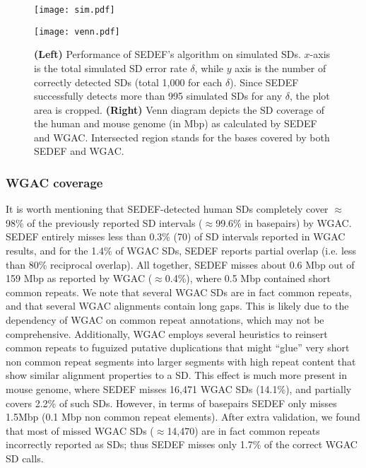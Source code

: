 \documentclass{article}
\begin{document}
\begin{figure*}
\centering
\begin{minipage}[t]{0.45\linewidth}
\texttt{[image: sim.pdf]}
\end{minipage}
\begin{minipage}[t]{0.49\linewidth}
\hspace{1em}\texttt{[image: venn.pdf]}
\end{minipage}
\caption{\textbf{(Left)} Performance of SEDEF's algorithm on simulated SDs. $x$-axis is the total simulated SD error rate $\delta$, while $y$ axis is the number of correctly detected SDs (total 1,000 for each $\delta$). Since SEDEF successfully detects more than 995 simulated SDs for any $\delta$, the plot area is cropped.
\textbf{(Right)} Venn diagram depicts the SD coverage of the human and mouse genome (in Mbp) as calculated by SEDEF and WGAC. Intersected region stands for the bases covered by both SEDEF and WGAC.
} 
\label{fig:err}
\end{figure*}


\subsubsection{WGAC coverage}
It is worth mentioning that SEDEF-detected human SDs completely cover $\approx$98\% of the previously reported SD intervals ($\approx$99.6\% in basepairs) by WGAC. SEDEF entirely misses less than 0.3\% (70) of SD intervals reported in WGAC results, and for the 1.4\% of WGAC SDs, SEDEF reports partial overlap (i.e. less than 80\% reciprocal overlap). All together, SEDEF misses about 0.6 Mbp out of 159 Mbp as reported by WGAC ($\approx$0.4\%), where 0.5 Mbp contained short common repeats.
We note that several WGAC SDs are in fact common repeats, and that several WGAC alignments contain long gaps. This is likely due to the dependency of WGAC on common repeat annotations, which may not be comprehensive. Additionally, WGAC employs several heuristics to reinsert common repeats to fuguized putative duplications that might ``glue'' very short non common repeat segments into larger segments with high repeat content that show similar alignment properties to a SD. 
This effect is much more present in mouse genome, where SEDEF misses 16,471 WGAC SDs (14.1\%), and partially covers 2.2\% of such SDs. However, in terms of basepairs SEDEF only misses 1.5Mbp (0.1 Mbp non common repeat elements). After extra validation, we found that most of missed WGAC SDs ($\approx$14,470) are in fact common repeats incorrectly reported as SDs; thus SEDEF misses only 1.7\% of the correct WGAC SD calls. 
\end{document}

